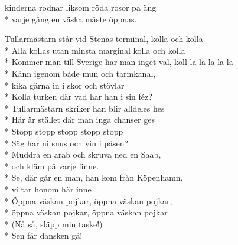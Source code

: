 \begin{SongText}[Tullarmästarn]
\begin{SongVerse}
        kinderna rodnar liksom röda rosor på äng\\*%
        varje gång en väska måste öppnas.
    \end{SongVerse}
    \begin{SongVerse}
        Tullarmästarn står vid Stenas terminal, kolla och kolla\\*%
        Alla kollas utan minsta marginal kolla och kolla\\*%
        Kommer man till Sverige har man inget val, koll-la-la-la-la-la\\*%
        Känn igenom både mun och tarmkanal,\\*%
        kika gärna in i skor och stövlar\\*%
        Kolla turken där vad har han i sin féz?\\*%
        Tullarmästarn skriker han blir alldeles hes\\*%
        Här är stället där man inga chanser ges\\*%
        Stopp stopp stopp stopp stopp\\*%
        Säg har ni snus och vin i påsen?\\*%
        Muddra en arab och skruva ned en Saab,\\*%
        och kläm på varje finne.\\*%
        Se, där går en man, han kom från Köpenhamn,\\*%
        vi tar honom här inne\\*%
        Öppna väskan pojkar, öppna väskan pojkar,\\*%
        öppna väskan pojkar, öppna väskan pojkar\\*%
        (Nå så, släpp min taske!)\\*%
        Sen får dansken gå!
    \end{SongVerse}
\end{SongText}
